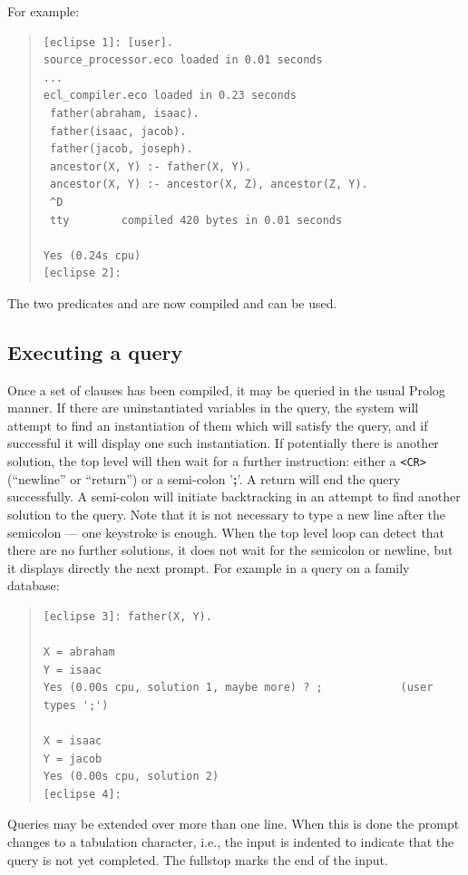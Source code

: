 For example:
\begin{quote}
\begin{verbatim}
[eclipse 1]: [user].
source_processor.eco loaded in 0.01 seconds
...
ecl_compiler.eco loaded in 0.23 seconds
 father(abraham, isaac).
 father(isaac, jacob).
 father(jacob, joseph).
 ancestor(X, Y) :- father(X, Y).
 ancestor(X, Y) :- ancestor(X, Z), ancestor(Z, Y).
 ^D
 tty        compiled 420 bytes in 0.01 seconds

Yes (0.24s cpu)
[eclipse 2]:
\end{verbatim}
\end{quote}
The two predicates  and  are now
compiled
and can be used.

\subsection{Executing a query}

Once a set of clauses has been compiled,
it may be queried in the usual Prolog manner.
If there are uninstantiated variables in the query,
the system will attempt to find an instantiation of them which will
satisfy the query, and if successful it will
display one such instantiation.
If potentially there is another solution, the top level 
will then wait for a further instruction: either a \verb+<CR>+
(``newline'' or ``return'') or a semi-colon '\textbf{;}'.
A return will end the query successfully.
A semi-colon will initiate backtracking%
in an attempt to find another solution to the query.
Note that it is not necessary to type a new line after the semicolon
--- one keystroke is enough.
When the top level loop can detect
that there are no further solutions, it does not wait for the semicolon
or newline, but it displays directly the next prompt.
For example in a query on
a family database:
\begin{quote}
\begin{verbatim}
[eclipse 3]: father(X, Y).

X = abraham
Y = isaac
Yes (0.00s cpu, solution 1, maybe more) ? ;            (user types ';')

X = isaac
Y = jacob
Yes (0.00s cpu, solution 2)
[eclipse 4]:
\end{verbatim}
\end{quote}

Queries may be extended over more than one line. When this is done the prompt
changes to a tabulation character, i.e., the input is indented to
indicate that the query is not yet completed.
The fullstop marks the end of the input.

